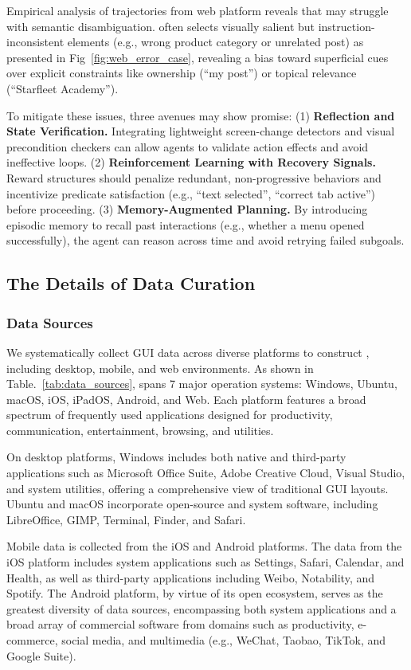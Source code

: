 Empirical analysis of trajectories from web platform reveals that \modelname may struggle with semantic disambiguation. \modelname often selects visually salient but instruction-inconsistent elements (e.g., wrong product category or unrelated post) as presented in Fig~\ref{fig:web_error_case}, revealing a bias toward superficial cues over explicit constraints like ownership (“my post”) or topical relevance (“Starfleet Academy”).  

To mitigate these issues, three avenues may show promise:
(1) \textbf{Reflection and State Verification.} Integrating lightweight screen-change detectors and visual precondition checkers can allow agents to validate action effects and avoid ineffective loops.
(2) \textbf{Reinforcement Learning with Recovery Signals.} Reward structures should penalize redundant, non-progressive behaviors and incentivize predicate satisfaction (e.g., ``text selected'', ``correct tab active'') before proceeding.
(3) \textbf{Memory-Augmented Planning.} By introducing episodic memory to recall past interactions (e.g., whether a menu opened successfully), the agent can reason across time and avoid retrying failed subgoals.


\subsection{The Details of Data Curation}
\label{sec:the_details_of_data_curation}
\subsubsection{Data Sources}
\label{sec:data_sources}
We systematically collect GUI data across diverse platforms to construct \ourdataset, including desktop, mobile, and web environments. As shown in Table.~\ref{tab:data_sources}, \ourdataset spans 7 major operation systems: Windows, Ubuntu, macOS, iOS, iPadOS, Android, and Web. Each platform features a broad spectrum of frequently used applications designed for productivity, communication, entertainment, browsing, and utilities.

On desktop platforms, Windows includes both native and third-party applications such as Microsoft Office Suite, Adobe Creative Cloud, Visual Studio, and system utilities, offering a comprehensive view of traditional GUI layouts. Ubuntu and macOS incorporate open-source and system software, including LibreOffice, GIMP, Terminal, Finder, and Safari.

Mobile data is collected from the iOS and Android platforms. The data from the iOS platform includes system applications such as Settings, Safari, Calendar, and Health, as well as third-party applications including Weibo, Notability, and Spotify. The Android platform, by virtue of its open ecosystem, serves as the greatest diversity of data sources, encompassing both system applications and a broad array of commercial software from domains such as productivity, e-commerce, social media, and multimedia (e.g., WeChat, Taobao, TikTok, and Google Suite).

